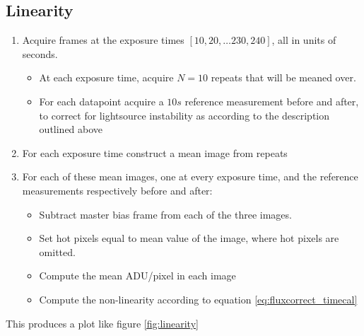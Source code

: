 \documentclass[../main.tex]{subfiles}
\begin{document}
		\subsection{Linearity}
		\begin{enumerate}
			\item Acquire frames at the exposure times
			$[10, 20, \dots 230, 240]$, all in units of seconds.
			\begin{itemize}
				\item At each exposure time, acquire $N = 10$ repeats that will be meaned over.
				\item For each datapoint acquire a $10s$ reference measurement before and after, to correct for lightsource instability as according to the description outlined above
			\end{itemize}
			\item For each exposure time construct a mean image from repeats
			\item For each of these mean images, one at every exposure time, and the reference measurements respectively before and after:
			\begin{itemize}
				\item Subtract master bias frame from each of the three images.
				\item Set hot pixels equal to mean value of the image, where hot pixels are omitted.
				\item Compute the mean ADU/pixel in each image
				\item Compute the non-linearity according to equation \ref{eq:fluxcorrect_timecal}
			\end{itemize}
		\end{enumerate}
		
		This produces a plot like figure \ref{fig:linearity}
		
\end{document}
